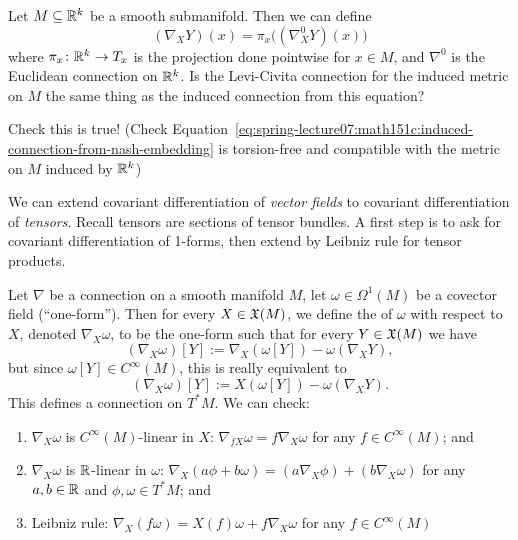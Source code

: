 \begin{example}
Let $M\subseteq\mathbb{R}^{k}$ be a smooth submanifold. Then we can define
\begin{equation}\label{eq:spring-lecture07:math151c:induced-connection-from-nash-embedding}
(\nabla_{X}Y)(x)=\pi_{x}\bigl((\nabla^{0}_{X}Y)(x)\bigr)
\end{equation}
where $\pi_{x}\colon\mathbb{R}^{k}\to T_{x}$ is the projection done pointwise
for $x\in M$, and $\nabla^{0}$ is the Euclidean connection on
$\mathbb{R}^{k}$. Is the Levi-Civita connection for the induced metric on $M$
the same thing as the induced connection from this equation?
\end{example}

\begin{xca}
Check this is true! (Check Equation~\eqref{eq:spring-lecture07:math151c:induced-connection-from-nash-embedding}
is torsion-free and compatible with the metric on $M$ induced by $\mathbb{R}^{k}$)
\end{xca}

\begin{node}
We can extend covariant differentiation of \emph{vector fields} to
covariant differentiation of \emph{tensors}. Recall tensors are
sections of tensor bundles. A first step is to ask for covariant
differentiation of 1-forms, then extend by Leibniz rule for tensor products.
\end{node}

\begin{definition}
Let $\nabla$ be a connection on a smooth manifold $M$, let
$\omega\in\Omega^{1}(M)$ be a covector field (``one-form''). Then for
every $X\in\mathfrak{X}(M)$, we define the  of
$\omega$ with respect to $X$, denoted $\nabla_{X}\omega$, to be the
one-form such that for every $Y\in\mathfrak{X}(M)$ we have
\begin{equation}
(\nabla_{X}\omega)[Y]:=\nabla_{X}(\omega[Y])-\omega(\nabla_{X}Y),
\end{equation}
but since $\omega[Y]\in C^{\infty}(M)$, this is really equivalent to
\begin{equation}
(\nabla_{X}\omega)[Y]:=X(\omega[Y])-\omega(\nabla_{X}Y).
\end{equation}
This defines a connection on $T^{*}M$. We can check: 
\begin{enumerate}
\item $\nabla_{X}\omega$ is $C^{\infty}(M)$-linear in $X$:
  $\nabla_{fX}\omega=f\nabla_{X}\omega$ for any $f\in C^{\infty}(M)$; and
\item $\nabla_{X}\omega$ is $\mathbb{R}$-linear in $\omega$:
  $\nabla_{X}(a\phi+b\omega)=(a\nabla_{X}\phi)+(b\nabla_{X}\omega)$
  for any $a,b\in\mathbb{R}$ and $\phi,\omega\in T^{*}M$; and
\item Leibniz rule: $\nabla_{X}(f\omega)=X(f)\omega+f\nabla_{X}\omega$
  for any $f\in C^{\infty}(M)$
\end{enumerate}
\end{definition}